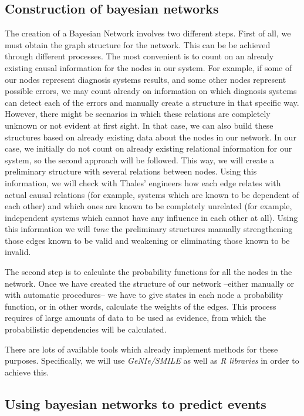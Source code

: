 \documentclass[a4paper,12pt]{article}
\begin{document}
\subsection{Construction of bayesian networks}
The creation of a Bayesian Network involves two different steps. First of all, we must obtain the graph structure for the network. This can be be achieved through different processes. The most convenient is to count on an already existing causal information for the nodes in our system. For example, if some of our nodes represent diagnosis systems results, and some other nodes represent possible errors, we may count already on information on which diagnosis systems can detect each of the errors and manually create a structure in that specific way. However, there might be scenarios in which these relations are completely unknown or not evident at first sight. In that case, we can also build these structures based on already existing data about the nodes in our network. In our case, we initially do not count on already existing relational information for our system, so the second approach will be followed. This way, we will create a preliminary structure with several relations between nodes. Using this information, we will check with Thales' engineers how each edge relates with actual causal relations (for example, systems which are known to be dependent of each other) and which ones are known to be completely unrelated (for example, independent systems which cannot have any influence in each other at all). Using this information we will \emph{tune} the preliminary structures manually strengthening those edges known to be valid and weakening or eliminating those known to be invalid.

The second step is to calculate the probability functions for all the nodes in the network. Once we have created the structure of our network --either manually or with automatic procedures-- we have to give states in each node a probability function, or in other words, calculate the weights of the edges. This process requires of large amounts of data to be used as evidence, from which the probabilistic dependencies will be calculated.

There are lots of available tools which already implement methods for these purposes. Specifically, we will use \emph{GeNIe/SMILE}\cite{druzdzel1999smile} as well as \emph{R libraries} in order to achieve this.

\subsection{Using bayesian networks to predict events}
\end{document}
